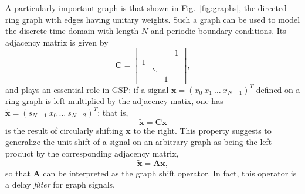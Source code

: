 A particularly important graph is that shown in Fig.~\ref{fig:graphs}, the directed ring graph with edges having unitary weights. Such a graph can be used to model the discrete-time domain with length $N$ and periodic boundary conditions. Its adjacency matrix is given by
\begin{equation}\label{eq:C}
\mathbf{C} =
\begin{bmatrix}
&  &  &   1\\ 
1 &  &   & \\ 
&   \ddots &  & \\ 
&  &   1 & 
\end{bmatrix},
\end{equation}
\noindent and plays an essential role in GSP: if a signal $ \mathbf{x} = (x_0 \ x_1 \ \dots \ x_{N-1})^T $ defined on a ring graph is left multiplied by the adjacency matix, one has $ \widetilde{\mathbf{x}} = (s_{N-1} \ x_0 \ \dots \ s_{N-2})^T $; that is,
\begin{equation}\label{eq:graph_shift_C}
\widetilde{\mathbf{x}} = \mathbf{C} \mathbf{x}
\end{equation}
\noindent is the result of circularly shifting $ \mathbf{x} $ to the right. This property suggests to generalize the unit shift of a signal on an arbitrary graph as being the left product by the corresponding adjacency matrix,
\begin{equation}\label{eq:graph_shift_A}
\widetilde{\mathbf{x}} = \mathbf{A} \mathbf{x},
\end{equation}
\noindent so that $ \mathbf{A} $ can be interpreted as the graph shift operator. In fact, this operator is a delay \emph{filter} for graph signals.

